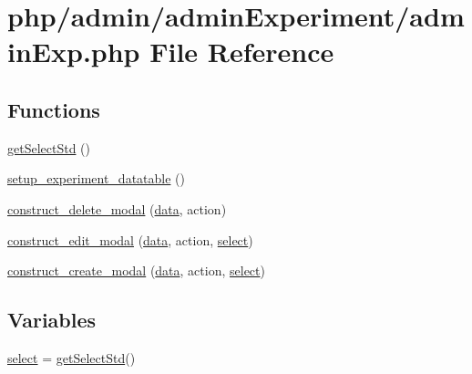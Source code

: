 \hypertarget{admin_exp_8php}{\section{php/admin/admin\-Experiment/admin\-Exp.php File Reference}
\label{admin_exp_8php}
}
\subsection*{Functions}
\begin{DoxyCompactItemize}
\item 
\hyperlink{admin_exp_8php_a22f8b2e1469128cde35ac846b0b24333}{get\-Select\-Std} ()
\item 
\hyperlink{admin_exp_8php_a3b7fa21c29f2265534745659558aab45}{setup\-\_\-experiment\-\_\-datatable} ()
\item 
\hyperlink{admin_exp_8php_a8a2de340effe508a796cc1c77e951d15}{construct\-\_\-delete\-\_\-modal} (\hyperlink{chart1_8php_ab3ed669f4b3fdb8c88f3a190fb907de0}{data}, action)
\item 
\hyperlink{admin_exp_8php_a346f7d5a906acbe413b62b06af0d629b}{construct\-\_\-edit\-\_\-modal} (\hyperlink{chart1_8php_ab3ed669f4b3fdb8c88f3a190fb907de0}{data}, action, \hyperlink{admin_exp_8php_ae180890d7caabe9962d544350eca4638}{select})
\item 
\hyperlink{admin_exp_8php_a4995f7ae90fbeb24441e325a1d75e582}{construct\-\_\-create\-\_\-modal} (\hyperlink{chart1_8php_ab3ed669f4b3fdb8c88f3a190fb907de0}{data}, action, \hyperlink{admin_exp_8php_ae180890d7caabe9962d544350eca4638}{select})
\end{DoxyCompactItemize}
\subsection*{Variables}
\begin{DoxyCompactItemize}
\item 
\hyperlink{admin_exp_8php_ae180890d7caabe9962d544350eca4638}{select} = \hyperlink{admin_exp_8php_a22f8b2e1469128cde35ac846b0b24333}{get\-Select\-Std}()
\end{DoxyCompactItemize}


